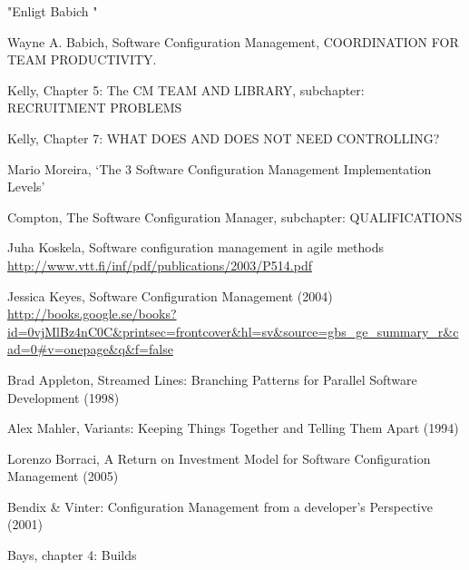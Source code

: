 \documentclass[10pt]{article}
\begin{document}
"Enligt Babich \cite{Babich}"


\begin{thebibliography}{1}

 Wayne A. Babich, Software Configuration Management, COORDINATION FOR TEAM PRODUCTIVITY.

 Kelly, Chapter 5: The CM TEAM AND LIBRARY, subchapter: RECRUITMENT PROBLEMS 

 Kelly, Chapter 7: WHAT DOES AND DOES NOT NEED CONTROLLING? 

 Mario Moreira, ‘The 3 Software Configuration Management Implementation Levels’

Compton, The Software Configuration Manager, subchapter: QUALIFICATIONS

Juha Koskela, Software configuration management in agile methods
\url{http://www.vtt.fi/inf/pdf/publications/2003/P514.pdf}

 Jessica Keyes, Software Configuration Management (2004) \url{http://books.google.se/books?id=0vjMlBz4nC0C&printsec=frontcover&hl=sv&source=gbs_ge_summary_r&cad=0#v=onepage&q&f=false}

 Brad Appleton, Streamed Lines: Branching Patterns for Parallel Software Development (1998)

 Alex Mahler, Variants: Keeping Things Together and Telling Them Apart (1994)

 Lorenzo Borraci, A Return on Investment Model for Software Configuration Management (2005)

 Bendix \& Vinter: Configuration Management from a developer's Perspective (2001)

 Bays, chapter 4: Builds

\end{thebibliography}
\end{document}
